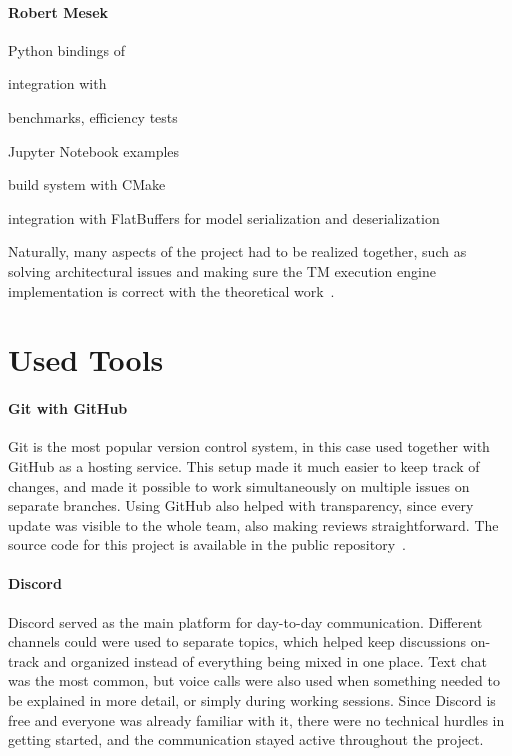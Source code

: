 \paragraph{Robert Mesek}
\begin{compactitem}
    \item Python bindings of \LibraryName
    \item integration with \GreenTsetlinName
    \item benchmarks, efficiency tests
    \item Jupyter Notebook examples
    \item build system with CMake
    \item integration with FlatBuffers for model serialization and deserialization
\end{compactitem}

Naturally, many aspects of the project had to be realized together, such as solving architectural issues and making sure the TM execution engine implementation is correct with the theoretical work~\cite{granmo2021tsetlinmachinegame}.

\section{Used Tools}

\paragraph{Git with GitHub}
Git is the most popular version control system, in this case used together with GitHub as a hosting service. This setup made it much easier to keep track of changes, and made it possible to work simultaneously on multiple issues on separate branches. Using GitHub also helped with transparency, since every update was visible to the whole team, also making reviews straightforward. The source code for this project is available in the public repository~\cite{tsetlin_machine_c}.

\paragraph{Discord}
Discord served as the main platform for day-to-day communication. Different channels could were used to separate topics, which helped keep discussions on-track and organized instead of everything being mixed in one place. Text chat was the most common, but voice calls were also used when something needed to be explained in more detail, or simply during working sessions. Since Discord is free and everyone was already familiar with it, there were no technical hurdles in getting started, and the communication stayed active throughout the project.

